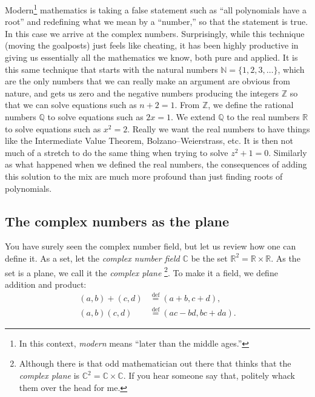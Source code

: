 \documentclass[12pt,openany]{book}
\newcommand{\C}{{\mathbb{C}}}
\newcommand{\R}{{\mathbb{R}}}
\newcommand{\Z}{{\mathbb{Z}}}
\newcommand{\N}{{\mathbb{N}}}
\newcommand{\Q}{{\mathbb{Q}}}
\newcommand{\myindex}[1]{#1\index{#1}}
\theoremstyle{plain}
\theoremstyle{remark}
\theoremstyle{definition}
\theoremstyle{exercise}
\theoremstyle{example}
\begin{document}

Modern\footnote{In this context, \emph{modern}
means ``later than the middle ages.''}
mathematics
is taking a false statement such as ``all
polynomials have a root'' and redefining what we mean by a ``number,''
so that the statement is true.  In this case we arrive at the complex
numbers.  Surprisingly, while this technique (moving the goalposts)
just feels like cheating, it has been highly productive in giving us
essentially all the mathematics we know, both pure and applied.  It is this same
technique that starts with the natural numbers
$\N = \{ 1,2,3,\ldots \}$, which are the only
numbers that we can really make an argument are obvious from nature,
and gets us zero and the negative numbers producing the integers
$\Z$ so that we can solve equations such as $n+2 = 1$.
From $\Z$, we define the rational numbers
$\Q$ to solve equations such as $2x=1$.  We extend
$\Q$ to the real numbers $\R$
to solve equations such as $x^2=2$.  Really we want the real numbers to
have things like the Intermediate Value Theorem, Bolzano--Weierstrass,
etc.  It is then not much of a stretch to do the same thing when trying
to solve $z^2+1=0$.  Similarly as what happened when we defined the real
numbers, the consequences of adding this solution to the mix are much more
profound than just finding roots of polynomials.

\subsection{The complex numbers as the plane}

You have surely seen the complex number field,
but let us review how one can define it.
As a set, let the \emph{\myindex{complex number field}}
$\C$ be the set $\R^2 = \R \times \R$.
As the set is a plane, we call it the \emph{\myindex{complex plane}}%
\footnote{Although there is that odd mathematician out there that
thinks that the \emph{complex plane} is $\C^2 = \C \times \C$.
If you hear someone say that, politely whack them over the head for me.}.
To make it a field, we define addition and product:
\begin{align*}
(a,b) + (c,d) & \overset{\text{def}}{=} (a+b,c+d) , \\
(a,b) (c,d) & \overset{\text{def}}{=} (ac-bd,bc+da) .
\end{align*}
\end{document}
